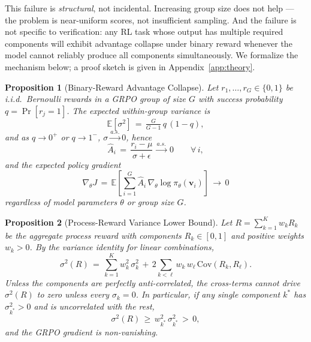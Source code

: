 \documentclass{article}
\newtheorem{proposition}{Proposition}
\begin{document}
This failure is \emph{structural}, not incidental.
Increasing group size does not help --- the problem is near-uniform scores, not insufficient sampling.
And the failure is not specific to verification: any RL task whose output has multiple required components will exhibit advantage collapse under binary reward whenever the model cannot reliably produce all components simultaneously.
We formalize the mechanism below; a proof sketch is given in Appendix~\ref{app:theory}.

\begin{proposition}[Binary-Reward Advantage Collapse]
\label{prop:collapse}
Let $r_1, \ldots, r_G \in \{0, 1\}$ be i.i.d.\ Bernoulli rewards in a GRPO group of size $G$ with success probability $q = \Pr[r_j {=} 1]$. The expected within-group variance is
\begin{equation}
\mathbb{E}[\sigma^2] \,=\, \tfrac{G}{G-1}\, q\,(1-q),
\label{eq:bernoulli-var}
\end{equation}
and as $q \to 0^+$ or $q \to 1^-$, $\sigma \xrightarrow{a.s.} 0$, hence
\begin{equation}
\hat{A}_i \,=\, \frac{r_i - \mu}{\sigma + \epsilon} \,\xrightarrow{a.s.}\, 0 \qquad \forall\, i,
\label{eq:adv-collapse}
\end{equation}
and the expected policy gradient
\begin{equation}
\nabla_\theta J \,=\, \mathbb{E}\!\left[\sum_{i=1}^{G} \hat{A}_i \, \nabla_\theta \log \pi_\theta(\mathbf{v}_i)\right] \,\to\, 0
\label{eq:grad-vanish}
\end{equation}
\emph{regardless of} model parameters $\theta$ or group size $G$.
\end{proposition}

\begin{proposition}[Process-Reward Variance Lower Bound]
\label{prop:variance}
Let $R = \sum_{k=1}^{K} w_k R_k$ be the aggregate process reward with components $R_k \in [0,1]$ and positive weights $w_k > 0$. By the variance identity for linear combinations,
\begin{equation}
\sigma^2(R) \,=\, \sum_{k=1}^{K} w_k^2\, \sigma_k^2 \,+\, 2\sum_{k<\ell} w_k\, w_\ell \,\mathrm{Cov}(R_k, R_\ell).
\label{eq:variance-decomp}
\end{equation}
Unless the components are perfectly anti-correlated, the cross-terms cannot drive $\sigma^2(R)$ to zero unless every $\sigma_k {=} 0$. In particular, if any single component $k^*$ has $\sigma_{k^*}^2 > 0$ and is uncorrelated with the rest,
\begin{equation}
\sigma^2(R) \,\geq\, w_{k^*}^2\, \sigma_{k^*}^2 \,>\, 0,
\label{eq:variance-lower}
\end{equation}
and the GRPO gradient is non-vanishing.
\end{proposition}
\end{document}
